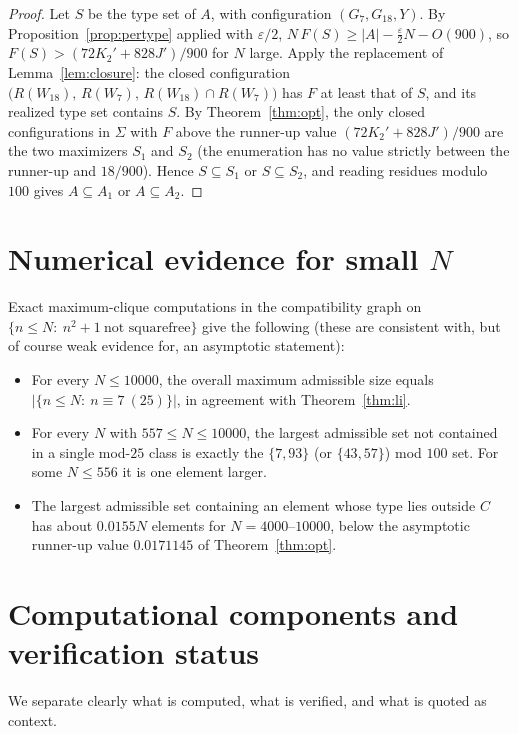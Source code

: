 \documentclass[11pt,a4paper]{article}
\theoremstyle{plain}
\theoremstyle{definition}
\theoremstyle{remark}
\begin{document}
\begin{proof}
Let $S$ be the type set of $A$, with configuration $(G_7,G_{18},Y)$. By
Proposition~\ref{prop:pertype} applied with $\varepsilon/2$,
$N\,F(S)\ge |A|-\frac{\varepsilon}{2}N-O(900)$, so
$F(S)>(72K_2'+828J')/900$ for $N$ large. Apply the replacement of
Lemma~\ref{lem:closure}: the closed configuration
$\bigl(R(W_{18}),\, R(W_7),\, R(W_{18})\cap R(W_7)\bigr)$ has $F$ at least that of $S$, and its
realized type set contains $S$. By Theorem~\ref{thm:opt}, the only closed configurations in
$\Sigma$ with $F$ above the runner-up value $(72K_2'+828J')/900$ are the two maximizers $S_1$ and
$S_2$ (the enumeration has no value strictly between the runner-up and $18/900$). Hence
$S\subseteq S_1$ or $S\subseteq S_2$, and reading residues modulo $100$ gives $A\subseteq A_1$ or
$A\subseteq A_2$.
\end{proof}

\section{Numerical evidence for small \texorpdfstring{$N$}{N}}\label{sec:small}

Exact maximum-clique computations in the compatibility graph on
$\{n\le N:\ n^2+1\ \text{not squarefree}\}$ give the following (these are consistent with, but of
course weak evidence for, an asymptotic statement):
\begin{itemize}
\item For every $N\le 10000$, the overall maximum admissible size equals
$|\{n\le N:\ n\equiv 7\ (25)\}|$, in agreement with Theorem~\ref{thm:li}.
\item For every $N$ with $557\le N\le 10000$, the largest admissible set not contained in a single
mod-$25$ class is exactly the $\{7,93\}$ (or $\{43,57\}$) mod $100$ set. For some $N\le 556$ it is one
element larger.
\item The largest admissible set containing an element whose type lies outside $C$ has about $0.0155N$
elements for $N=4000$--$10000$, below the asymptotic runner-up value $0.0171145$ of
Theorem~\ref{thm:opt}.
\end{itemize}

\section{Computational components and verification status}\label{sec:verif}

We separate clearly what is computed, what is verified, and what is quoted as context.
\end{document}
